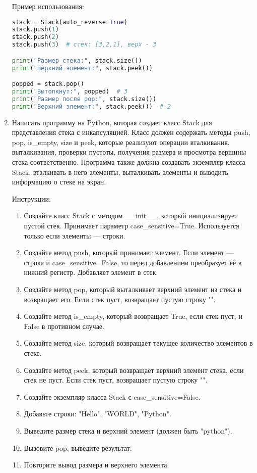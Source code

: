\begin{enumerate}
Пример использования:
\begin{lstlisting}[language=Python]
stack = Stack(auto_reverse=True)
stack.push(1)
stack.push(2)
stack.push(3)  # стек: [3,2,1], верх - 3

print("Размер стека:", stack.size())
print("Верхний элемент:", stack.peek())

popped = stack.pop()
print("Вытолкнут:", popped)  # 3
print("Размер после pop:", stack.size())
print("Верхний элемент:", stack.peek())  # 2
\end{lstlisting}

\item Написать программу на Python, которая создает класс Stack для представления стека с инкапсуляцией. Класс должен содержать методы push, pop, is\_empty, size и peek, которые реализуют операции вталкивания, выталкивания, проверки пустоты, получения размера и просмотра вершины стека соответственно. Программа также должна создавать экземпляр класса Stack, вталкивать в него элементы, выталкивать элементы и выводить информацию о стеке на экран.

Инструкции:
\begin{enumerate}
    \item Создайте класс Stack с методом \_\_init\_\_, который инициализирует пустой стек. Принимает параметр case\_sensitive=True. Используется только если элементы — строки.
    \item Создайте метод push, который принимает элемент. Если элемент — строка и case\_sensitive=False, то перед добавлением преобразует её в нижний регистр. Добавляет элемент в стек.
    \item Создайте метод pop, который выталкивает верхний элемент из стека и возвращает его. Если стек пуст, возвращает пустую строку "".
    \item Создайте метод is\_empty, который возвращает True, если стек пуст, и False в противном случае.
    \item Создайте метод size, который возвращает текущее количество элементов в стеке.
    \item Создайте метод peek, который возвращает верхний элемент стека, если стек не пуст. Если стек пуст, возвращает пустую строку "".
    \item Создайте экземпляр класса Stack с case\_sensitive=False.
    \item Добавьте строки: "Hello", "WORLD", "Python".
    \item Выведите размер стека и верхний элемент (должен быть "python").
    \item Вызовите pop, выведите результат.
    \item Повторите вывод размера и верхнего элемента.
\end{enumerate}


\end{enumerate}
